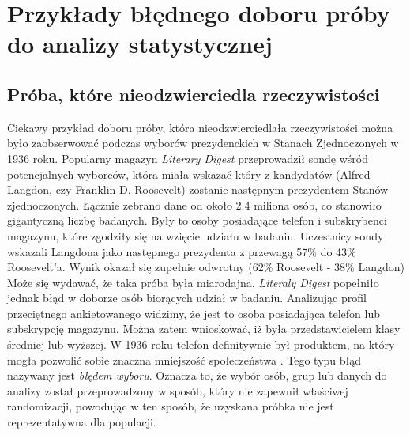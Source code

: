 \documentclass{classrep}
\begin{document}
    \section{Przykłady błędnego doboru próby do analizy statystycznej}
    \label{wrong_examples} {

        \subsection{Próba, które nieodzwierciedla rzeczywistości}
        \label{wrong_examples:reality} {
            Ciekawy przykład doboru próby, która nieodzwierciedlała rzeczywistości można było zaobserwować podczas wyborów prezydenckich w Stanach Zjednoczonych w 1936 roku. Popularny magazyn \emph{Literary Digest} przeprowadził sondę wśród potencjalnych wyborców, która miała wskazać który z kandydatów (Alfred Langdon, czy Franklin D. Roosevelt) zostanie następnym prezydentem Stanów zjednoczonych. Łącznie zebrano dane od około 2.4 miliona osób, co stanowiło gigantyczną liczbę badanych. Były to osoby posiadające telefon i subskrybenci magazynu, które zgodziły się na wzięcie udziału w badaniu. Uczestnicy sondy wskazali Langdona jako następnego prezydenta z przewagą 57\% do 43\% Roosevelt'a. Wynik okazał się zupełnie odwrotny (62\% Roosevelt - 38\% Langdon) Może się wydawać, że taka próba była miarodajna. \emph{Literaly Digest} popełniło jednak błąd w doborze osób biorących udział w badaniu. Analizując profil przeciętnego ankietowanego widzimy, że jest to osoba posiadająca telefon lub subskrypcję magazynu. Można zatem wnioskować, iż była przedstawicielem klasy średniej lub wyższej. W 1936 roku telefon definitywnie był produktem, na który mogła pozwolić sobie znaczna mniejszość społeczeństwa \cite{digest_study}. Tego typu błąd nazywany jest \emph{błędem wyboru}. Oznacza to, że wybór osób, grup lub danych do analizy został przeprowadzony w sposób, który nie zapewnił właściwej randomizacji, powodując w ten sposób, że uzyskana próbka nie jest reprezentatywna dla populacji.
        }

}
\end{document}
